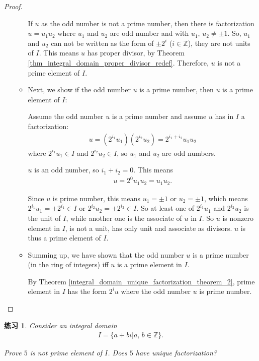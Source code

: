 \documentclass[utf8]{ctexbook}
\newtheorem{exercise}{练习}[section]
\begin{document}
\begin{proof}
\begin{enumerate}
\begin{itemize}
{If $u$ as the odd number is not a prime number, then there is factorization $u = u_1 u_2$ where $u_1$ and $u_2$ are odd number and with $u_1, \, u_2 \neq \pm 1$. So, $u_1$ and $u_2$ can not be written as the form of $\pm 2^i$ ($i \in \mathbb{Z}$), they are not units of $I$. This means $u$ has proper divisor, by Theorem \ref{thm_integral_domain_proper_divisor_redef}. Therefore, $u$ is not a prime element of $I$.}
\item{Next, we show if the odd number $u$ is a prime number, then $u$ is a prime element of $I$:

Assume the odd number $u$ is a prime number and assume $u$ has in $I$ a factorization:
\begin{align*}
u = (2^{i_1}u_1 ) ( 2^{i_2} u_2 ) = 2^{i_1 + i_2} u_1 u_2
\end{align*}
where $2^{i_1}u_1 \in I$ and $2^{i_2} u_2 \in I$, so $u_1$ and $u_2$ are odd numbers.

$u$ is an odd number, so $i_1 + i_2 =0$. This means 
\begin{align*}
u = 2^0 u_1 u_2 = u_1 u_2 .
\end{align*}

Since $u$ is prime number, this means $u_1 = \pm 1$ or $u_2 = \pm 1$, which means $2^{i_1}u_1 = \pm  2^{i_1} \in I$ or $ 2^{i_2} u_2 = \pm 2^{i_2} \in I$. So at least one of $2^{i_1}u_1$ and $2^{i_2} u_2 $ is the unit of $I$, while another one is the associate of $u$ in $I$. So $u$ is nonzero element in $I$, is not a unit, has only unit and associate as divisors. $u$ is thus a prime element of $I$. 
 }
\item{Summing up, we have shown that the odd number $u$ is a prime number (in the ring of integers) iff $u$ is a prime element in $I$. 

By Theorem \ref{integral_domain_unique_factorization_theorem_2}, prime element in $I$ has the form $2^i u$ where the odd number $u$ is prime number.}
\end{itemize}

\end{enumerate}

\end{proof}


\begin{exercise}
Consider an integral domain
\begin{align*}
I = \{ a + bi | a, \, b \in \mathbb{Z} \} .
\end{align*}

Prove $5$ is not prime element of $I$. Does $5$ have unique factorization?

\end{exercise}
\end{document}
